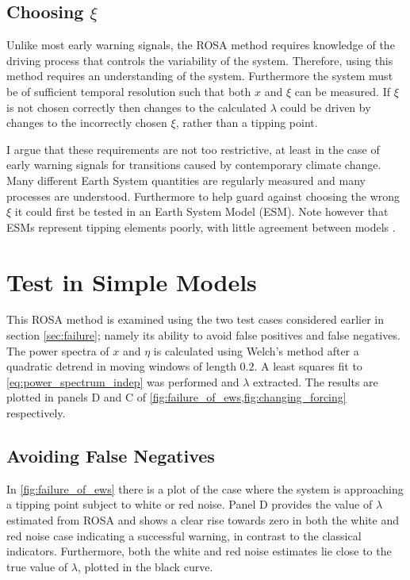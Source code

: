 \subsection{Choosing $\xi$}
Unlike most early warning signals, the ROSA method requires knowledge of
the driving process that controls the variability of the system.
Therefore, using this method requires an understanding
of the system. Furthermore the system must be of sufficient temporal resolution such that 
both $x$ and $\xi$ can be measured. If $\xi$ is not chosen
correctly then changes to the calculated $\lambda$ could be driven
by changes to the incorrectly chosen $\xi$, rather than a 
tipping point. 

I argue that these requirements are not too restrictive, at least in the 
case of early warning signals for transitions caused by contemporary
climate change. Many different Earth System quantities are regularly 
measured and many processes are understood. Furthermore to help 
guard against choosing the wrong $\xi$ it could first be tested in an Earth System Model (ESM). Note however that ESMs represent tipping elements 
poorly, with little agreement between models \parencite{Drijfhout2015}.


\section{Test in Simple Models}
This ROSA method is examined using the two test cases considered earlier in 
section \cref{sec:failure}; namely its ability to avoid 
false positives and false negatives.
The power spectra of $x$ and $\eta$ is calculated 
using Welch's method \parencite{Welch1967} after a quadratic 
detrend in moving windows of length $0.2$. A least
squares fit to
\cref{eq:power_spectrum_indep} was performed and $\lambda$ extracted. 
The results are plotted in panels D and C of \cref{fig:failure_of_ews,fig:changing_forcing} respectively.

\subsection{Avoiding False Negatives}
In \cref{fig:failure_of_ews} there is a plot of the case
where the system is approaching a tipping point
subject to white or red noise. Panel D provides
the value of $\lambda$ estimated from ROSA and shows a clear
rise towards zero in both the white and red noise case indicating
a successful warning, in contrast to the classical indicators. Furthermore, both the
white and red noise estimates lie close to the true value of 
$\lambda$, plotted in the black curve.

